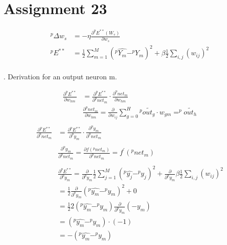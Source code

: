 \documentclass[fleqn]{article}
\begin{document}
  
\section{Assignment 23}

\begin{equation*}
\begin{aligned}
^{ p }\Delta w_{ s } & =-\eta \frac { \partial ^{ p }E^{ ** }(W_{ s }) }{ \partial w_{ s } } \\
^{ p }E^{ ** } & =\frac { 1 }{ 2 } \sum _{ m=1 }^{ M } (^{ p }\hat { Y_{ m } } -^{ p }Y_{ m })^{ 2 }+\beta \frac { 1 }{ 2 } \sum _{ i,j } (w_{ ij })^{ 2 } \\
\end{aligned}
\end{equation*}

. Derivation for an output neuron m.

\begin{equation*}
\begin{aligned}
\frac { \partial ^{ p }E^{ ** } }{ \partial w_{ hm } }  & =\frac { \partial ^{ p }E^{ ** } }{ \partial ^{ p }net_{ m } } \cdot \frac { \partial ^{ p }net_{ m } }{ \partial w_{ hm } } \\
& \frac { \partial ^{ p }net_{ m } }{ \partial w_{ hm } }  = \frac { \partial  }{ \partial w_{ ij } } \sum _{ g=0 }^{ H } { ^{ p } \widetilde { out_{ g } } \cdot { w_{ gm } }} =^{ p } \widetilde { out_{ h } } \\
\end{aligned}
\end{equation*}
\begin{equation*}
\begin{aligned}
\frac { \partial ^{ p }E^{**} }{ \partial ^{ p }net_{ m } } & =\frac { \partial ^{ p }E^{**} }{ \partial ^{ p }y_{ m } } \cdot \frac { \partial ^{ p }y_{ m } }{ \partial ^{ p }net_{ m } }\\\\
& \frac { \partial ^{ p }y_{ m } }{ \partial ^{ p }net_{ m } } =\frac { \partial f(^{ p }net_{ m }) }{ \partial ^{ p }net_{ m } } =f^{ ' }(^{ p }net_{ m })\\\\
& \frac { \partial ^{ p }E^{**} }{ \partial ^{ p }y_{ m } } =\frac { \partial  }{ \partial ^{ p }y_{ m } } \frac { 1 }{ 2 } \sum _{ j=1 }^{ M } (^{ p }\hat { y_{ j } } -^{ p }y_{ j })^{ 2 } + \frac { \partial  }{ \partial ^{ p }y_{ m } } \beta \frac{1}{2} \sum_{i,j}{(w_{ij})^{2}}\\
& = \frac { 1 }{ 2 } \frac { \partial  }{ \partial ^{ p }y_{ m } } (^{ p }\hat { y_{ m } } -^{ p }y_{ m })^{ 2 } + 0\\
&= \frac { 1 }{ 2 } 2 (^{ p }\hat { y_{ m } } -^{ p }y_{ m })       \frac { \partial  }{ \partial ^{ p }y_{ m } } (-y_m) \\
&= (^{ p }\hat { y_{ m } } -^{ p }y_{ m }) \cdot (-1)\\
&= -(^{ p }\hat { y_{ m } } -^{ p }y_{ m })\\\\
\end{aligned}
\end{equation*}
\end{document}
